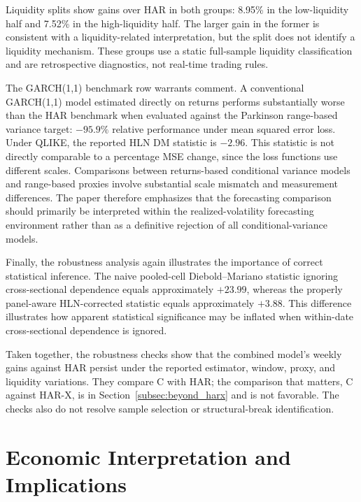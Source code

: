 \documentclass[jrfm,article,submit,moreauthors,pdftex]{Definitions/mdpi}
\begin{document}
Liquidity splits show gains over HAR in both groups: 8.95\% in the
low-liquidity half and 7.52\% in the high-liquidity half. The larger gain in
the former is consistent with a liquidity-related interpretation, but the
split does not identify a liquidity mechanism. These groups use a static
full-sample liquidity classification and are retrospective diagnostics,
not real-time trading rules.

The GARCH(1,1) benchmark row warrants comment. A conventional GARCH(1,1)
model estimated directly on returns performs substantially worse than the
HAR benchmark when evaluated against the Parkinson range-based variance
target: $-95.9\%$ relative performance under mean squared error loss.
Under QLIKE, the reported HLN DM statistic is $-2.96$. This statistic
is not directly comparable to a percentage MSE change, since the loss
functions use different scales. Comparisons between returns-based
conditional variance models and range-based proxies involve substantial scale mismatch
and measurement differences. The paper therefore emphasizes that the
forecasting comparison should primarily be interpreted within the
realized-volatility forecasting environment rather than as a definitive
rejection of all conditional-variance models.

Finally, the robustness analysis again illustrates the importance of
correct statistical inference. The naive pooled-cell Diebold--Mariano
statistic ignoring cross-sectional dependence equals approximately
$+23.99$, whereas the properly panel-aware HLN-corrected statistic equals
approximately $+3.88$. This difference illustrates how
apparent statistical significance may be inflated when within-date
cross-sectional dependence is ignored.

Taken together, the robustness checks show that the combined model's
weekly gains against HAR persist under the reported estimator, window,
proxy, and liquidity variations. They compare C with HAR; the comparison
that matters, C against HAR-X, is in Section~\ref{subsec:beyond_harx} and
is not favorable. The checks also do not resolve sample selection or
structural-break identification.

\section{Economic Interpretation and Implications}
\label{sec:economic}
\end{document}

